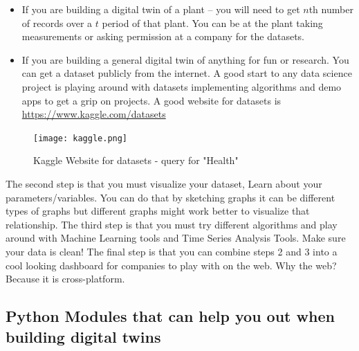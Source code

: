 \begin{itemize}
\item    If you are building a digital twin of a plant – you will need to get $n$th number of records over a $t$ period of that plant. You can be at the plant taking measurements or asking permission at a company for the datasets.
\item	If you are building a general digital twin of anything for fun or research. You can get a dataset publicly from the internet. A good start to any data science project is playing around with datasets implementing algorithms and demo apps to get a grip on projects.
        A good website for datasets is \url{https://www.kaggle.com/datasets}
\end{itemize}    

\begin{figure}[H]
    \centering
    \texttt{[image: kaggle.png]}
    \caption{
        Kaggle Website for datasets - query for "Health"
        }
    \label{fig:dataset}
\end{figure}

The second step is that you must visualize your dataset, Learn about your parameters/variables. You can do that by sketching graphs it can be different types of graphs but different graphs might work better to visualize that relationship.
The third step is that you must try different algorithms and play around with Machine Learning tools and Time Series Analysis Tools. Make sure your data is clean! 
The final step is that you can combine steps 2 and 3 into a cool looking dashboard for companies to play with on the web. Why the web? Because it is cross-platform.

\subsection{Python Modules that can help you out when building digital twins}

